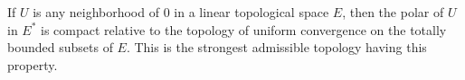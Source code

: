 If $U$ is any neighborhood of $0$ in a linear topological space $E$, then the polar of $U$ in $E^*$ is compact relative to the topology of uniform convergence on the totally bounded subsets of $E$. This is the strongest admissible topology having this property.
